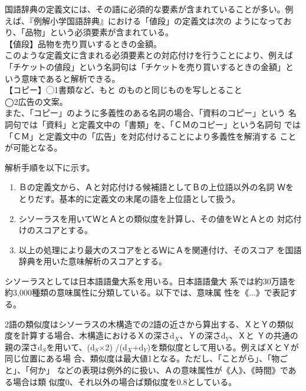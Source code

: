 \documentclass{nlp}
\begin{document}
  国語辞典の定義文には、その語に必須的な要素が含まれていることが多い。例
  えば、『例解小学国語辞典』\cite{Reikai}における「値段」の定義文は次の
  ようになっており、「品物」という必須要素が含まれている。
  \vspace{1.5ex}\\
  \hspace{1em}【値段】品物を売り買いするときの金額。
  \vspace{1.5ex}\\ 
  このような定義文に含まれる必須要素との対応付けを行うことにより、例えば
  「チケットの値段」という名詞句は「チケットを売り買いするときの金額」と
  いう意味であると解析できる。
  \vspace{1.5ex}\\
  \hspace{1em}【コピー】◯\hspace{-0.77em}1\hspace{0.6em}書類など、もと
  のものと同じものを写しとること\\
  \hspace{5.8em}◯\hspace{-0.77em}2\hspace{0.6em}広告の文案。
  \vspace{1.5ex}\\
  また、「コピー」のように多義性のある名詞の場合、「資料のコピー」という
  名詞句では「資料」と定義文中の「書類」を、「ＣＭのコピー」という名詞句
  では「ＣＭ」と定義文中の「広告」を対応付けることにより多義性を解消する
  ことが可能となる。
  
  解析手順を以下に示す。
  \begin{enumerate}
   \item Ｂの定義文から、Ａと対応付ける候補語としてＢの上位語以外の名詞
	 Ｗをとりだす。基本的に定義文の末尾の語を上位語として扱う。
   \item シソーラスを用いてＷとＡとの類似度を計算し、その値をＷとＡとの
	 対応付けのスコアとする。
   \item 以上の処理により最大のスコアをとるＷにＡを関連付け、そのスコア
	 を国語辞典を用いた意味解析のスコアとする。
  \end{enumerate}

  シソーラスとしては日本語語彙大系\cite{GoiTaikei}を用いる。日本語語彙大
  系では約30万語を約3,000種類の意味属性に分類している。以下では、意味属
  性を《...》で表記する。
  
  2語の類似度はシソーラスの木構造での2語の近さから算出する、ＸとＹの類似
  度を計算する場合、木構造におけるＸの深さd$_{X}$、Ｙの深さd$_{Y}$、Ｘと
  Ｙの共通の親の深さd$_{S}$を用いて、(d$_{S}$$\times$2)
  /(d$_{X}$+d$_{Y}$)を類似度として用いる。例えばＸとＹが同じ位置にある場
  合、類似度は最大値1となる。ただし、「ことがら」、「物ごと」、「何か」
  などの表現は例外的に扱い、Ａの意味属性が《人》、《時間》である場合は類
  似度0、それ以外の場合ば類似度を0.8としている。
   
\end{document}
